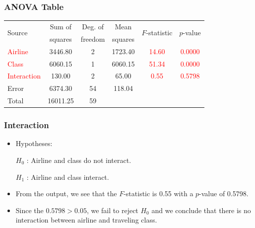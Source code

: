 \documentclass[12pt]{beamer}
\begin{document}
\begin{frame}
	\frametitle{ANOVA Table}
		\small
	
	\begin{center}
		\begin{tabular}{lccccc}
			\toprule
			\multirow{2}{*}{Source}& Sum of & Deg. of & Mean & \multirow{2}{*}{$F$-statistic} & \multirow{2}{*}{$p$-value} \\
			& squares & freedom & squares &&\\
			\midrule
			\textcolor{red}{Airline} & 3446.80 & 2 & 1723.40 & \textcolor{red}{14.60} & \textcolor{red}{0.0000} \\
			\textcolor{red}{Class} & 6060.15 & 1 & 6060.15 & \textcolor{red}{51.34} & \textcolor{red}{0.0000} \\
			\textcolor{red}{Interaction} & 130.00 & 2 & 65.00 & \textcolor{red}{0.55} & \textcolor{red}{0.5798} \\
			Error & 6374.30 & 54 & 118.04 & & \\
			\midrule
			Total & 16011.25 & 59 & & & \\
			\bottomrule
		\end{tabular}
	\end{center}
	
\end{frame}
\begin{frame}
	\frametitle{Interaction}
	
	\begin{itemize}[label={\color{blue}$\blacktriangleright$}]
		\item Hypotheses:
		
		\vspace{0.3cm}
		$H_0$ : Airline and class do not interact.
		
		$H_1$ : Airline and class interact.
		
		\item From the output, we see that the $F$-statistic is 0.55 with a $p$-value of 0.5798.
		
		\item Since the $0.5798 > 0.05$, we fail to reject $H_0$ and we conclude that there is no interaction between airline and traveling class.
	\end{itemize}
	
\end{frame}
\end{document}
